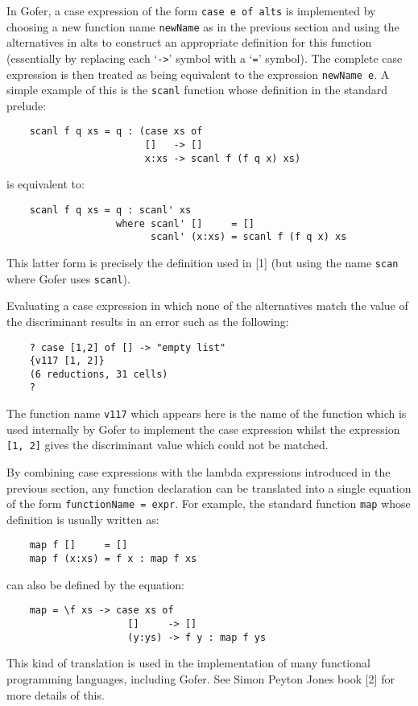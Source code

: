 In Gofer, a case expression of the form \verb"case e of alts"  is  implemented
by choosing a new function name \verb"newName" as in  the  previous  section
and  using  the  alternatives  in  alts  to  construct  an  appropriate
definition for this function (essentially by replacing each `\verb"->"' symbol
with a `\verb"="' symbol).  The complete case expression is  then  treated  as
being equivalent to the expression \verb"newName e".  A  simple  example  of
this is the \verb"scanl" function whose definition in the standard prelude:
\begin{verbatim}
    scanl f q xs = q : (case xs of
                        []   -> []
                        x:xs -> scanl f (f q x) xs)
\end{verbatim}
is equivalent to:
\begin{verbatim}
    scanl f q xs = q : scanl' xs
                   where scanl' []     = []
                         scanl' (x:xs) = scanl f (f q x) xs
\end{verbatim}
This latter form is precisely the definition used in [1] (but using the
name \verb"scan" where Gofer uses \verb"scanl").

Evaluating a case expression in which none of  the  alternatives  match
the value  of  the  discriminant  results  in  an  error  such  as  the
following:
\begin{verbatim}
    ? case [1,2] of [] -> "empty list"
    {v117 [1, 2]}
    (6 reductions, 31 cells)
    ?
\end{verbatim}
The function name \verb"v117" which appears here is the name of the function
which is used internally by Gofer  to  implement  the  case  expression
whilst the expression \verb"[1, 2]" gives the discriminant value which could
not be matched.

By combining case expressions with the lambda expressions introduced in
the previous section, any function declaration can be translated into a
single equation of the form \verb"functionName = expr".  For example,  the
standard function \verb"map" whose definition is usually written as:
\begin{verbatim}
    map f []     = []
    map f (x:xs) = f x : map f xs
\end{verbatim}
can also be defined by the equation:
\begin{verbatim}
    map = \f xs -> case xs of
                     []     -> []
                     (y:ys) -> f y : map f ys
\end{verbatim}
This kind  of  translation  is  used  in  the  implementation  of  many
functional programming languages, including Gofer.   See  Simon  Peyton
Jones book [2] for more details of this.


